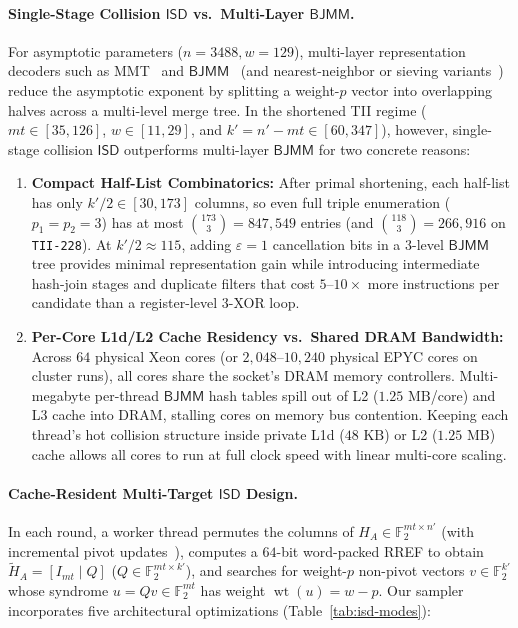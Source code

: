\documentclass[11pt,a4paper]{article}
\theoremstyle{definition}
\theoremstyle{remark}
\newcommand{\F}{\mathbb{F}}
\newcommand{\wt}{\operatorname{wt}}
\newcommand{\ISD}{\mathsf{ISD}}
\newcommand{\BJMM}{\mathsf{BJMM}}
\begin{document}
\paragraph{Single-Stage Collision $\ISD$ vs.\ Multi-Layer $\BJMM$.}
For asymptotic parameters ($n = 3488, w = 129$), multi-layer representation decoders such as MMT~\cite{MMT11} and $\BJMM$~\cite{BJMM12} (and nearest-neighbor or sieving variants~\cite{MO15,DEEK24}) reduce the asymptotic exponent by splitting a weight-$p$ vector into overlapping halves across a multi-level merge tree. In the shortened TII regime ($mt \in [35, 126]$, $w \in [11, 29]$, and $k' = n' - mt \in [60, 347]$), however, single-stage collision $\ISD$ outperforms multi-layer $\BJMM$ for two concrete reasons:
\begin{enumerate}[leftmargin=2em]
    \item \textbf{Compact Half-List Combinatorics:}
    After primal shortening, each half-list has only $k'/2 \in [30, 173]$ columns, so even full triple enumeration ($p_1 = p_2 = 3$) has at most $\binom{173}{3} = 847{,}549$ entries (and $\binom{118}{3} = 266{,}916$ on \texttt{TII-228}). At $k'/2 \approx 115$, adding $\varepsilon = 1$ cancellation bits in a $3$-level $\BJMM$ tree provides minimal representation gain while introducing intermediate hash-join stages and duplicate filters that cost $5\text{--}10\times$ more instructions per candidate than a register-level 3-XOR loop.
    \item \textbf{Per-Core L1d/L2 Cache Residency vs.\ Shared DRAM Bandwidth:}
    Across $64$ physical Xeon cores (or $2{,}048\text{--}10{,}240$ physical EPYC cores on cluster runs), all cores share the socket's DRAM memory controllers. Multi-megabyte per-thread $\BJMM$ hash tables spill out of L2 ($1.25\text{ MB}$/core) and L3 cache into DRAM, stalling cores on memory bus contention. Keeping each thread's hot collision structure inside private L1d ($48\text{ KB}$) or L2 ($1.25\text{ MB}$) cache allows all cores to run at full clock speed with linear multi-core scaling.
\end{enumerate}

\paragraph{Cache-Resident Multi-Target $\ISD$ Design.}
In each round, a worker thread permutes the columns of $H_A \in \F_2^{mt \times n'}$ (with incremental pivot updates~\cite{CC98}), computes a $64$-bit word-packed RREF to obtain $\tilde{H}_A = [I_{mt} \mid Q]$ ($Q \in \F_2^{mt \times k'}$), and searches for weight-$p$ non-pivot vectors $v \in \F_2^{k'}$ whose syndrome $u = Q v \in \F_2^{mt}$ has weight $\wt(u) = w - p$. Our sampler incorporates five architectural optimizations (Table~\ref{tab:isd-modes}):
\end{document}
